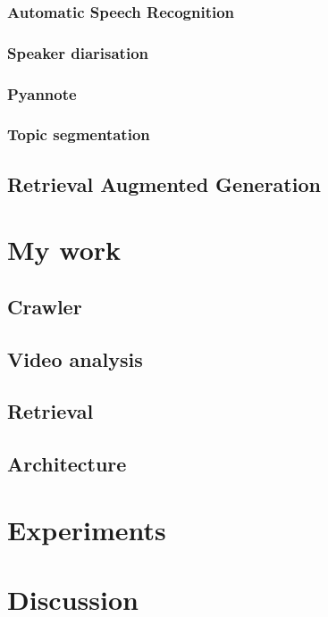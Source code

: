 \documentclass[twoside]{uva-inf-bachelor-thesis}
\begin{document}
\subsection{Automatic Speech Recognition}
\lipsum[2]

\subsection{Speaker diarisation}
\lipsum[2]

\subsection{Pyannote}
\lipsum[2]

\subsection{Topic segmentation}
\lipsum[2]

\section{Retrieval Augmented Generation}
\lipsum[2]


\chapter{My work}
\section{Crawler}
\lipsum[10]

\section{Video analysis}

\section{Retrieval}

\section{Architecture}
\lipsum[10]

\chapter{Experiments}

\chapter{Discussion}

\printbibliography
\end{document}
